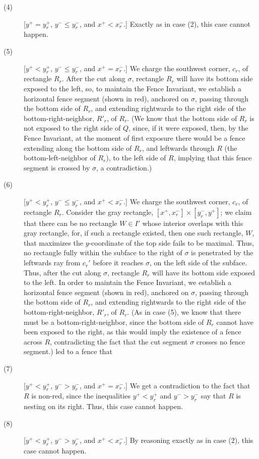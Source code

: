 \documentclass{article}
\begin{document}
\begin{description}
\item[(4)] [$y^+=y^+_r$, $y^-\leq y^-_r$, and $x^+<x^-_r$.] Exactly as
  in case (2), this case cannot happen.

\item[(5)] [$y^+<y^+_r$, $y^-\leq y^-_r$, and $x^+=x^-_r$.]  We charge
  the southwest corner, $c_r$, of rectangle $R_r$. After the cut along
  $\sigma$, rectangle $R_r$ will have its bottom side exposed to the
  left, so, to maintain the Fence Invariant, we establish a horizontal
 fence segment (shown in red), anchored on
  $\sigma$, passing through the bottom side of $R_r$, and extending
  rightwards to the right side of the bottom-right-neighbor, $R'_r$, of
  $R_r$.  (We know that the bottom side of $R_r$ is not exposed to the
  right side of $Q$, since, if it were exposed, then, by the Fence
  Invariant, at the moment of first exposure there would be a fence
  extending along the bottom side of $R_r$, and leftwards through $R$
  (the bottom-left-neighbor of $R_r$), to the left side of $R$, implying
  that this fence segment is crossed by $\sigma$, a contradiction.)

\item[(6)] [$y^+<y^+_r$, $y^-\leq y^-_r$, and $x^+<x^-_r$.] We charge
  the southwest corner, $c_r$, of rectangle $R_r$. Consider the gray
  rectangle, $[x^+,x^-_r]\times[y^-_r,y^+]$; we claim that there can
  be no rectangle $W\in I'$ whose interior overlaps with this gray
  rectangle, for, if such a rectangle existed, then one such
  rectangle, $W$, that maximizes the $y$-coordinate of the top side
  fails to be maximal. Thus, no rectangle fully within the subface to the right of $\sigma$ is penetrated by the
  leftwards ray from $c_r'$ before it reaches $\sigma$, on the left side of the subface. Thus, after
  the cut along $\sigma$, rectangle $R_r$ will have its bottom side
  exposed to the left. In order to maintain the Fence Invariant, we
  establish a horizontal 
 fence segment (shown in red), anchored on
  $\sigma$, passing through the bottom side of $R_r$, and extending
  rightwards to the right side of the bottom-right-neighbor, $R'_r$, of
  $R_r$.  (As in case (5), we know that there must be a bottom-right-neighbor,
  since the bottom side of $R_r$ cannot have been exposed to the right, as this would imply
  the existence of a fence across $R$, contradicting the fact that the cut segment $\sigma$ crosses no fence segment.)
  led to a fence that

\item[(7)] [$y^+<y^+_r$, $y^-> y^-_r$, and $x^+=x^-_r$.] We get a
  contradiction to the fact that $R$ is non-red, since the
  inequalities $y^+<y^+_r$ and $y^-> y^-_r$ say that $R$ is nesting on
  its right. Thus, this case cannot happen.

\item[(8)] [$y^+<y^+_r$, $y^-> y^-_r$, and $x^+<x^-_r$.] By reasoning
  exactly as in case (2), this case cannot happen.
\end{description}
\end{document}
